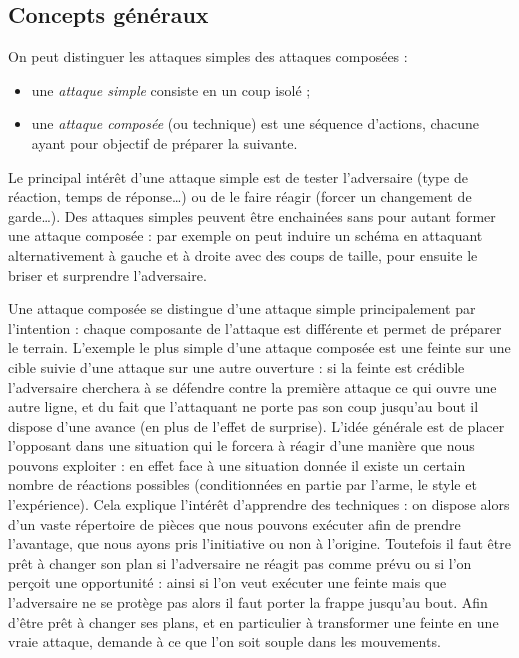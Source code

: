 \subsection{Concepts généraux}
\label{sec:att-def:attaque:concepts}


\begin{definition}

	\noindent
	On peut distinguer les attaques simples des attaques composées :
	\begin{itemize}
		\item une \emph{attaque simple} consiste en un coup isolé ;
		\item une \emph{attaque composée} (ou technique) est une séquence d'actions, chacune ayant pour objectif de préparer la suivante.
	\end{itemize}
\end{definition}


Le principal intérêt d'une attaque simple est de tester l'adversaire (type de réaction, temps de réponse…) ou de le faire réagir (forcer un changement de garde…).
Des attaques simples peuvent être enchainées sans pour autant former une attaque composée : par exemple on peut induire un schéma en attaquant alternativement à gauche et à droite avec des coups de taille, pour ensuite le briser et surprendre l'adversaire.

Une attaque composée se distingue d'une attaque simple principalement par l'intention : chaque composante de l'attaque est différente et permet de préparer le terrain.
L'exemple le plus simple d'une attaque composée est une feinte sur une cible suivie d'une attaque sur une autre ouverture : si la feinte est crédible l'adversaire cherchera à se défendre contre la première attaque ce qui ouvre une autre ligne, et du fait que l'attaquant ne porte pas son coup jusqu'au bout il dispose d'une avance (en plus de l'effet de surprise).
L'idée générale est de placer l'opposant dans une situation qui le forcera à réagir d'une manière que nous pouvons exploiter : en effet face à une situation donnée il existe un certain nombre de réactions possibles (conditionnées en partie par l'arme, le style et l'expérience).
Cela explique l'intérêt d'apprendre des techniques : on dispose alors d'un vaste répertoire de pièces que nous pouvons exécuter afin de prendre l'avantage, que nous ayons pris l'initiative ou non à l'origine.
Toutefois il faut être prêt à changer son plan si l'adversaire ne réagit pas comme prévu ou si l'on perçoit une opportunité : ainsi si l'on veut exécuter une feinte mais que l'adversaire ne se protège pas alors il faut porter la frappe jusqu'au bout.
Afin d'être prêt à changer ses plans, et en particulier à transformer une feinte en une vraie attaque, demande à ce que l'on soit souple dans les mouvements.

